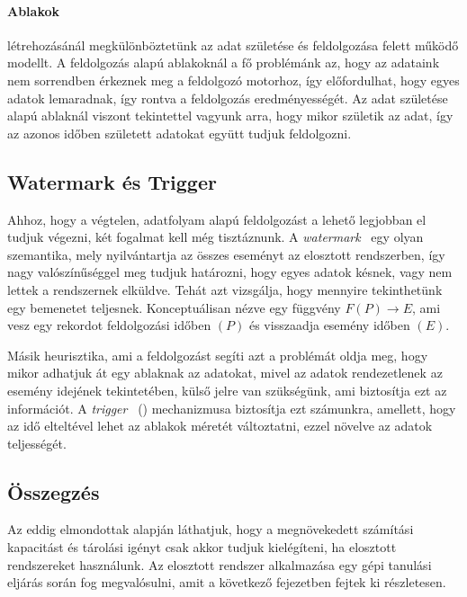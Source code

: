 \documentclass[a4paper,12pt]{article}
\begin{document}
\paragraph{Ablakok}\hspace*{-0.4cm} létrehozásánál megkülönböztetünk az adat születése és feldolgozása felett működő modellt. A feldolgozás alapú ablakoknál a fő problémánk az, hogy az adataink nem sorrendben érkeznek meg a feldolgozó motorhoz, így előfordulhat, hogy egyes adatok lemaradnak, így rontva a feldolgozás eredményességét. Az adat születése alapú ablaknál viszont tekintettel vagyunk arra, hogy mikor születik az adat, így az azonos időben született adatokat együtt tudjuk feldolgozni.

\subsection{Watermark és Trigger}

Ahhoz, hogy a végtelen, adatfolyam alapú feldolgozást a lehető legjobban el tudjuk végezni, két fogalmat kell még tisztáznunk. A \textit{watermark}~\parencite{millwheel} egy olyan szemantika, mely nyilvántartja az összes eseményt az elosztott rendszerben, így nagy valószínűséggel meg tudjuk határozni, hogy egyes adatok késnek, vagy nem lettek a rendszernek elküldve. Tehát azt vizsgálja, hogy mennyire tekinthetünk egy bemenetet teljesnek. Konceptuálisan nézve egy függvény     $F(P) \rightarrow E$, ami vesz egy rekordot feldolgozási időben $(P)$ és visszaadja esemény időben $(E)$. \newline

Másik heurisztika, ami a feldolgozást segíti azt a problémát oldja meg, hogy mikor adhatjuk át egy ablaknak az adatokat, mivel az adatok rendezetlenek az esemény idejének tekintetében, külső jelre van szükségünk, ami biztosítja ezt az információt. A \textit{trigger} ~(\cite{skew}) mechanizmusa biztosítja ezt számunkra, amellett, hogy az idő elteltével lehet az ablakok méretét változtatni, ezzel növelve az adatok teljességét. 
	
\subsection{Összegzés}
Az eddig elmondottak alapján láthatjuk, hogy a megnövekedett számítási kapacitást és tárolási igényt csak akkor tudjuk kielégíteni, ha elosztott rendszereket használunk. Az elosztott rendszer alkalmazása egy gépi tanulási eljárás során fog megvalósulni, amit a következő fejezetben fejtek ki részletesen.
\end{document}
